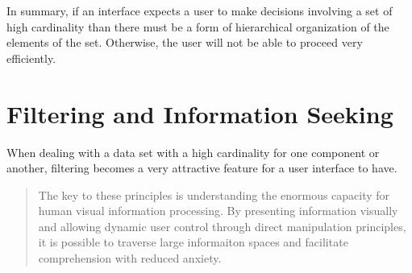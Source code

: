 In summary, if an interface expects a user to make decisions involving a set of high cardinality than there must be a form of hierarchical organization of the elements of the set. Otherwise, the user will not be able to proceed very efficiently.

\section{Filtering and Information Seeking}

\begin{comment}
The Structure of the Information Visualization Design Space, Section 5
dynamic queries technique 

Visual Information Seeking: Tight Coupling of Dynamic Query Filters with Starfield Displays
\end{comment}

When dealing with a data set with a high cardinality for one component or another, filtering becomes a very attractive feature for a user interface to have. 

\begin{quote}
The key to these principles is understanding the enormous capacity for human visual information processing. By presenting information visually and allowing dynamic user control through direct manipulation principles, it is possible to traverse large informaiton spaces and facilitate comprehension with reduced anxiety. \cite{seeking1994}
\end{quote}
